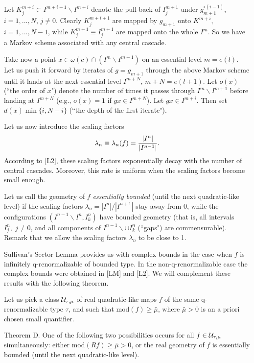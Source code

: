 Let $K^{m+i}_j\subset I^{m+i-1}\backslash I^{m+i}$ denote
the pull-back of $I^{m+1}_j$ under $g_{m+1}^{\circ(i-1)}$, $i=1,...,N$, $j\not=0$.
Clearly  $K^{m+i+1}_j$ are mapped by $g_{m+1}$ onto $K^{m+i}$, $i=1,..., N-1$,
while $K^{m+1}_j\equiv I^{m+1}_j$ are mapped onto the whole $I^m$.
So we have a Markov scheme associated with any central cascade.


Take now a point $x\in \omega(c)\cap (I^m\backslash I^{m+1})$ on an
essential level $m=e(l)$. 
Let us push it forward 
by iterates of $g=g_{m+1}$ through the above Markov scheme until it lands
at the next essential level $I^{m+N}$, $m+N=e(l+1)$.
 Let $o(x)$ (``the order of $x$")
 denote the number of times it passes through
 $I^m\backslash I^{m+1}$ before landing at $I^{m+N}$
(e.g., $o(x)=1$ if $g x\in I^{m+N}$). Let $g x\in I^{m+i}$.
Then set $d(x)\min \{i, N-i\}$ (``the depth of the first iterate").


Let us now introduce the scaling factors
$$\lambda_n\equiv \lambda_n(f)={|I^n|\over |I^{n-1}|}.$$
According to [L2],
these scaling factors exponentially decay with the number
of central cascades.
Moreover, this rate is uniform when the scaling factors become small enough.

Let us call the geometry of $f$  {\sl essentially bounded} 
(until the next quadratic-like level)
if the scaling factors $\lambda_n=|I^n|/|I^{n+1}|$ stay away from 0,
while the configurations $(I^{n-1}\backslash I^n, I^n_k)$ have
bounded geometry (that is, all intervals $I^n_j,\; j\not=0$, and all components of
$I^{n-1}\backslash \cup I^n_k$  (``gaps")
are commensurable). Remark that we allow the scaling factors $\lambda_n$
to be close to 1.


 
\medskip
{}
 Sullivan's Sector Lemma provides us with complex
bounds in the case when $f$ is infinitely q-renormalizable of bounded type.
In the  non-q-renormalizable case 
 the complex bounds were obtained in [LM] and [L2].
We will complement these results with the following theorem.
 
Let us pick a class ${\cal U}_{\tau, \bar\mu}$ 
  of real quadratic-like maps $f$
  of the same q-renormalizable type $\tau$, and such that
   mod$(f)\geq \bar\mu$, where $\bar\mu>0$
 is an a priori chosen small quantifier.

 
\proclaim Theorem D.   One of the following two possibilities occurs
  for all $f\in {\cal U}_{\tau,\mu}$ simultaneously:
  either mod$(R f)\geq\bar\mu>0$, or
  the real geometry  of $f$ is essentially bounded (until the next
quadratic-like level).
 
